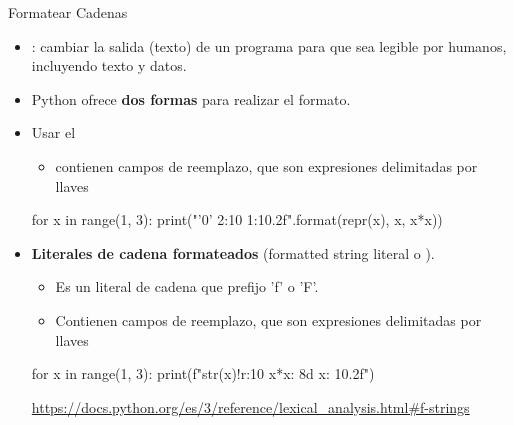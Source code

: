 \documentclass[10pt, envcountsect , spanish]{beamer}
\begin{document}
\begin{frame}[fragile]{Formatear Cadenas} 
\begin{itemize}
\item {}: cambiar la salida (texto) de un programa para que sea legible por humanos, incluyendo texto y datos.

\item Python ofrece \textbf{dos formas} para realizar el formato.

\item Usar el  
\begin{itemize}
\item {} contienen campos de reemplazo, que son expresiones delimitadas por llaves \cm{\{\}}
\end{itemize}

{\small
\begin{pyconsole}[][frame=single, fontsize=\scriptsize]
for x in range(1, 3):
  print("'{0}' {2:10} {1:10.2f}".format(repr(x), x, x*x))
 
\end{pyconsole}
}

\item \textbf{Literales de cadena formateados} (formatted string literal o ). 
\begin{itemize}
\item Es un literal de cadena que  prefijo  'f' o 'F'. 
\item Contienen campos de reemplazo, que son expresiones delimitadas por llaves \cm{\{\}}
\end{itemize}

{\small
\begin{pyconsole}[][frame=single, fontsize=\scriptsize]
for x in range(1, 3):
  print(f"{str(x)!r:10} {x*x: 8d} {x: 10.2f}")
 
\end{pyconsole}
}

\tiny \url{https://docs.python.org/es/3/reference/lexical_analysis.html#f-strings}
\end{itemize}

\end{frame}
\end{document}
